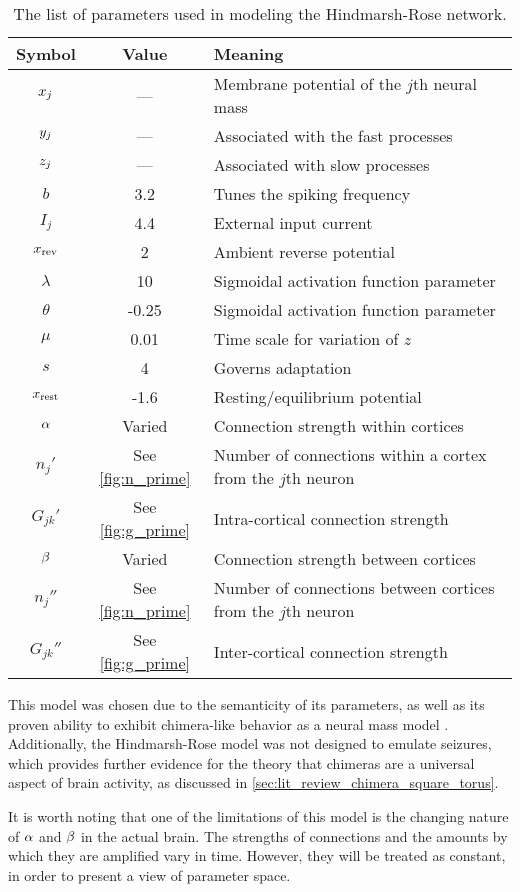 \begin{table}[ht]
  \centering
  \begin{tabular}{c | c | p{}}
    Symbol & Value & Meaning \\ \hline
    $x_{j}$ & --- & Membrane potential of the $j$th neural mass \\
    $y_{j}$ & --- & Associated with the fast processes \\
    $z_{j}$ & --- & Associated with slow processes \\ \hline
    $b$ & 3.2 & Tunes the spiking frequency \\
    $I_{j}$ & 4.4 & External input current \\
    $x_{\text{rev}}$ & 2 & Ambient reverse potential \\
    $\lambda$ & 10 & Sigmoidal activation function parameter \\
    $\theta$ & -0.25 & Sigmoidal activation function parameter \\
    $\mu$ & 0.01 & Time scale for variation of $z$ \\
    $s$ & 4 & Governs adaptation \\
    $x_{\text{rest}}$ & -1.6 & Resting/equilibrium potential \\ \hline
    $\alpha$ & Varied & Connection strength within cortices \\
    $n_{j}'$ & See \cref{fig:n_prime} & Number of connections within a cortex from the $j$th neuron \\
    $G_{j k}'$ & See \cref{fig:g_prime} & Intra-cortical connection strength \\
    $\beta$ & Varied & Connection strength between cortices \\
    $n_{j}''$ & See \cref{fig:n_prime} & Number of connections between cortices from the $j$th neuron \\
    $G_{j k}''$ & See \cref{fig:g_prime} & Inter-cortical connection strength
  \end{tabular}
  \caption[Hindmarsh-Rose Parameters]{The list of parameters used in modeling the Hindmarsh-Rose network.}
  \label{tab:hr_params}
\end{table}

This model was chosen due to the semanticity of its parameters, as well as its proven ability to exhibit chimera-like behavior as a neural mass model \cite{Santos2017}.
Additionally, the Hindmarsh-Rose model was not designed to emulate seizures, which provides further evidence for the theory that chimeras are a universal aspect of brain activity, as discussed in \cref{sec:lit_review_chimera_square_torus}.

It is worth noting that one of the limitations of this model is the changing nature of $\alpha$ and $\beta$ in the actual brain.
The strengths of connections and the amounts by which they are amplified vary in time.
However, they will be treated as constant, in order to present a view of parameter space.

